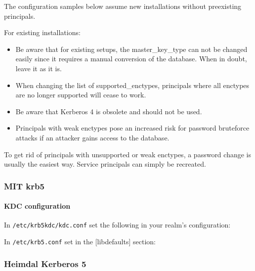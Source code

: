 The configuration samples below assume new installations without preexisting principals.

For existing installations:
\begin{itemize}
	\item Be aware that for existing setups, the master\_key\_type can not be changed easily since it requires a manual conversion of the database. When in doubt, leave it as it is. 
	\item When changing the list of supported\_enctypes, principals where all enctypes are no longer supported will cease to work.
	\item Be aware that Kerberos 4 is obsolete and should not be used.
	\item Principals with weak enctypes pose an increased risk for password bruteforce attacks if an attacker gains access to the database.
\end{itemize}

To get rid of principals with unsupported or weak enctypes, a password change is usually the easiest way. Service principals can simply be recreated. 

\subsubsection{MIT krb5}
\gdef\currentsubsectionname{krb5}
\paragraph{KDC configuration}
In \verb#/etc/krb5kdc/kdc.conf# set the following in your realm's
configuration:

In \verb#/etc/krb5.conf# set in the [libdefaults] section:


\subsubsection{Heimdal Kerberos 5}


